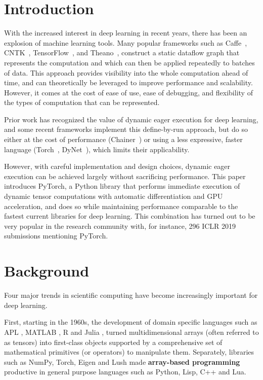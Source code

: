 \section{Introduction} \label{introduction}

With the increased interest in deep learning in recent years, there has been an explosion of machine learning tools. Many popular frameworks such as Caffe~\cite{Caffe}, CNTK~\cite{CNTK}, TensorFlow~\cite{TF}, and Theano~\cite{Theano}, construct a static dataflow graph that represents the computation and which can then be applied repeatedly to batches of data. This approach provides visibility into the whole computation ahead of time, and can theoretically be leveraged to improve performance and scalability. However, it comes at the cost of ease of use, ease of debugging, and flexibility of the types of computation that can be represented. 

Prior work has recognized the value of dynamic eager execution for deep learning, and some recent frameworks implement this define-by-run approach, but do so either at the cost of performance (Chainer~\cite{Chainer}) or using a less expressive, faster language (Torch~\cite{Torch}, DyNet~\cite{DyNet}), which limits their applicability.

However, with careful implementation and design choices, dynamic eager execution can be achieved largely without sacrificing performance. This paper introduces PyTorch, a Python library that performs immediate execution of dynamic tensor computations with automatic differentiation and GPU acceleration, and does so while maintaining performance comparable to the fastest current libraries for deep learning. This combination has turned out to be very popular in the research community with, for instance, 296 ICLR 2019 submissions mentioning PyTorch.

\section{Background}

Four major trends in scientific computing have become increasingly important for deep learning.

First, starting in the 1960s, the development of domain specific languages such as APL \cite{APL}, MATLAB \cite{Matlab}, R \cite{R} and Julia \cite{Julia}, turned multidimensional arrays (often referred to as tensors) into first-class objects supported by a comprehensive set of mathematical primitives (or operators) to manipulate them. Separately, libraries such as NumPy\cite{Numpy}, Torch\cite{Torch}, Eigen\cite{eigenweb} and Lush\cite{Lush} made \textbf{array-based programming} productive in general purpose languages such as Python, Lisp, C++ and Lua.

